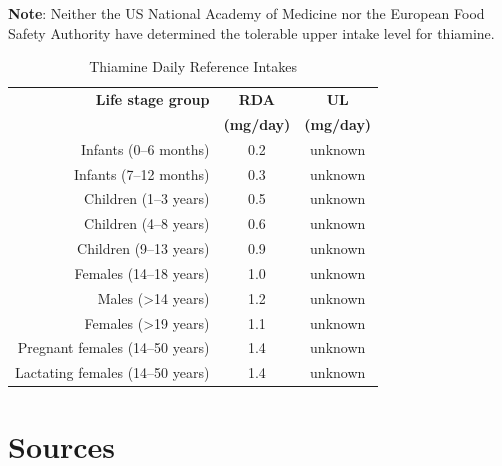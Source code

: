 \documentclass{book}
\begin{document}
\begin{sloppypar}
\textbf{Note}: Neither the US National Academy of Medicine nor the European Food Safety Authority have determined the tolerable upper intake level for thiamine.

\begin{table}[ht]
	\caption{Thiamine Daily Reference Intakes}
	\centering \begin{tabular}{| r | c | c |}
		\hline
		\textbf{Life stage group}			& \textbf{RDA}		& \textbf{UL}		\\
											& \textbf{(mg/day)}	& \textbf{(mg/day)}	\\ \hline
		Infants (0--6 months)				& 0.2				& unknown			\\ \hline
		Infants (7--12 months)				& 0.3				& unknown			\\ \hline
		Children (1--3 years)				& 0.5				& unknown			\\ \hline
		Children (4--8 years)				& 0.6				& unknown			\\ \hline
		Children (9--13 years)				& 0.9				& unknown			\\ \hline
		Females (14--18 years)				& 1.0				& unknown			\\ \hline
		Males (\textgreater14 years)		& 1.2				& unknown			\\ \hline
		Females (\textgreater19 years)		& 1.1				& unknown			\\ \hline
		Pregnant females (14--50 years)		& 1.4				& unknown			\\ \hline
		Lactating females (14--50 years)	& 1.4				& unknown			\\ \hline
	\end{tabular}
\end{table}
\newpage

\section{Sources}



\end{sloppypar}
\end{document}
